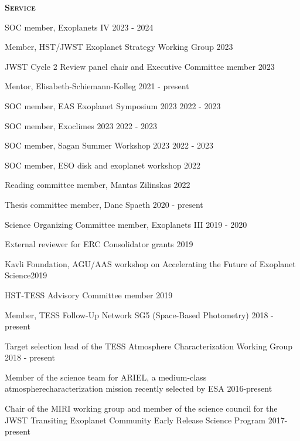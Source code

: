 \documentclass[12pt,letterpaper]{article}
\begin{document}
\textbf{\textsc{Service}} 
\begin{compactitem}[]
\item {SOC member, Exoplanets IV \hfill 2023 - 2024}
\item {Member, HST/JWST Exoplanet Strategy Working Group \hfill 2023}
\item {JWST Cycle 2 Review panel chair and Executive Committee member \hfill 2023}
\item{Mentor, Elisabeth-Schiemann-Kolleg \hfill 2021 - present}
\item {SOC member, EAS Exoplanet Symposium 2023 \hfill 2022 - 2023}
\item {SOC member, Exoclimes 2023 \hfill 2022 - 2023}
\item {SOC member, Sagan Summer Workshop 2023 \hfill 2022 - 2023}
\item {SOC member, ESO disk and exoplanet workshop \hfill 2022}
\item {Reading committee member, Mantas Zilinskas \hfill 2022}
\item {Thesis committee member, Dane Spaeth \hfill 2020 -  present}
\item {Science Organizing Committee member, Exoplanets III \hfill 2019 - 2020}
\item {External reviewer for ERC Consolidator grants \hfill 2019}
\item {Kavli Foundation, AGU/AAS workshop on Accelerating the Future of Exoplanet Science\hfill 2019}
\item {HST-TESS Advisory Committee member \hfill 2019}
\item {Member, TESS Follow-Up Network SG5 (Space-Based Photometry) \hfill 2018 - present}
\item {Target selection lead of the TESS Atmosphere Characterization Working Group \hfill 2018 - present}	
\item {Member of the science team for ARIEL, a medium-class atmosphere\newline characterization mission recently selected by ESA \hfill 2016-present}
\item {Chair of the MIRI working group and member of the science council for the \newline JWST Transiting Exoplanet Community Early Release Science Program \hfill 2017- present}

\end{compactitem}
\end{document}
